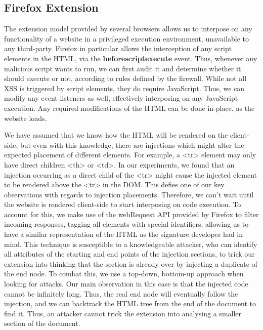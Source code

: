  \subsection{Firefox Extension}
 The extension model provided by several browsers allows us to interpose on any functionality of a website in a privileged execution environment, unavailable to any third-party. Firefox in particular allows the interception of any script elements in the HTML, via the \textbf{beforescriptexecute} event. Thus, whenever any malicious script wants to run, we can first audit it and determine whether it should execute or not, according to rules defined by the firewall. While not all XSS is triggered by script elements, they do require JavaScript. Thus, we can modify any event listeners as well, effectively interposing on any JavaScript execution. Any required modifications of the HTML can be done in-place, as the website loads. 
 
We have assumed that we know how the HTML will be rendered on the client-side, but even with this knowledge, there are injections which might alter the expected placement of different elements. For example, a <tr> element may only have direct children <th> or <td>. In our experiments, we found that an injection occurring as a direct child of the <tr> might cause the injected element to be rendered above the <tr> in the DOM. This defies one of our key observations with regards to injection placements. Therefore, we can't wait until the website is rendered client-side to start interposing on code execution. To account for this, we make use of the webRequest API provided by Firefox to filter incoming responses, tagging all elements with special identifiers, allowing us to have a similar representation of the HTML as the signature developer had in mind. This technique is susceptible to a knowledgeable attacker, who can identify all attributes of the starting and end points of the injection sections, to trick our extension into thinking that the section is already over by injecting a duplicate of the end node. To combat this, we use a top-down, bottom-up approach when looking for attacks. Our main observation in this case is that the injected code cannot be infinitely long. Thus, the real end node will eventually follow the injection, and we can backtrack the HTML tree from the end of the document to find it. Thus, an attacker cannot trick the extension into analysing a smaller section of the document.
